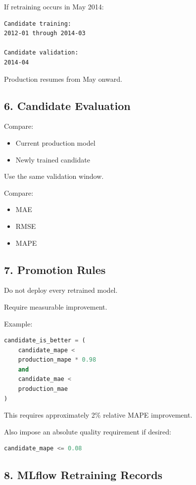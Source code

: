 \documentclass[11pt,a4paper]{article}
\begin{document}
If retraining occurs in May 2014:

\begin{lstlisting}
Candidate training:
2012-01 through 2014-03

Candidate validation:
2014-04
\end{lstlisting}

Production resumes from May onward.

\subsection{6. Candidate Evaluation}

Compare:

\begin{itemize}
    \item Current production model
    \item Newly trained candidate
\end{itemize}

Use the same validation window.

Compare:

\begin{itemize}
    \item MAE
    \item RMSE
    \item MAPE
\end{itemize}

\subsection{7. Promotion Rules}

Do not deploy every retrained model.

Require measurable improvement.

Example:

\begin{lstlisting}[language=Python]
candidate_is_better = (
    candidate_mape <
    production_mape * 0.98
    and
    candidate_mae <
    production_mae
)
\end{lstlisting}

This requires approximately 2\% relative MAPE improvement.

Also impose an absolute quality requirement if desired:

\begin{lstlisting}[language=Python]
candidate_mape <= 0.08
\end{lstlisting}

\subsection{8. MLflow Retraining Records}
\end{document}
